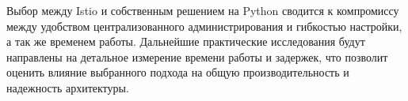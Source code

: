 Выбор между Istio и собственным решением на Python сводится к компромиссу между удобством централизованного администрирования и гибкостью настройки, а так же временем работы. Дальнейшие практические исследования будут направлены на детальное измерение времени работы и задержек, что позволит оценить влияние выбранного подхода на общую производительность и надежность архитектуры.


